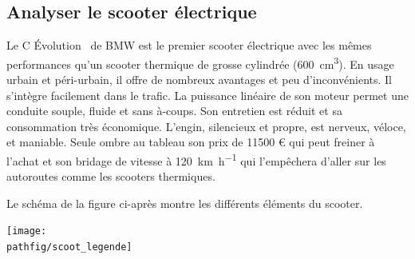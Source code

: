 \documentclass[10pt,fleqn]{article} %
\begin{document}
\def\pathfig{images}

\vspace{8cm}
\pagestyle{fancy}
\thispagestyle{plain}

\def\columnseprulecolor{\color{ocre}}
\setlength{\columnseprule}{0.4pt} 

\def\pathfig{images}

\begin{multicols}{2}
\section*{Analyser le scooter électrique\\}



Le C Évolution\textregistered ~ de BMW est le premier scooter électrique avec les mê\-mes performances qu'un scooter thermique de grosse cylindrée (\SI{600}{cm^3}). En usage urbain et péri-urbain, il offre de nombreux avantages et peu d'inconvénients. Il s'intègre facilement dans le trafic. La puissance linéaire de son moteur permet une con\-dui\-te souple, fluide et sans à-coups. Son entretien est réduit et sa consommation très économique. L'engin, silencieux et propre, est nerveux, véloce, et maniable. 
Seule ombre au tableau son prix de \num{11500} € qui peut freiner à l'achat et son bridage de vitesse à \SI{120}{km.h^{-1}} qui l'empêchera d'aller sur les autoroutes comme les scooters thermiques. 

Le schéma de la figure ci-après montre les différents éléments du scooter.



\texttt{[image: \\pathfig/scoot\_legende]}
%



\end{multicols}
\end{document}
